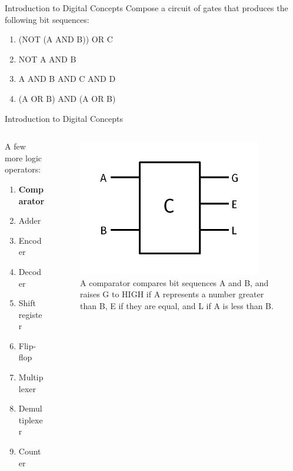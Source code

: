 \documentclass{beamer}
\begin{document}
\begin{frame}{Introduction to Digital Concepts}
Compose a circuit of gates that produces the following bit sequences:
\begin{enumerate}
\item (NOT (A AND B)) OR C
\item NOT A AND B
\item A AND B AND C AND D
\item (A OR B) AND (A OR B)
\end{enumerate}
\end{frame}

\begin{frame}{Introduction to Digital Concepts}
\begin{columns}[T]
\begin{column}{0.5\textwidth}
A few more logic operators:
\begin{enumerate}
\item \textbf{\alert{Comparator}}
\item Adder
\item Encoder
\item Decoder
\item Shift register
\item Flip-flop
\item Multiplexer
\item Demultiplexer
\item Counter
\end{enumerate}
\end{column}
\begin{column}{0.5\textwidth}
\begin{figure}
\centering
\includegraphics[width=0.9\textwidth]{figures/Comparator.pdf}
\caption{\label{fig:comparator} A comparator compares bit sequences A and B, and raises G to HIGH if A represents a number greater than B, E if they are equal, and L if A is less than B.}
\end{figure}
\end{column}
\end{columns}
\end{frame}
\end{document}
